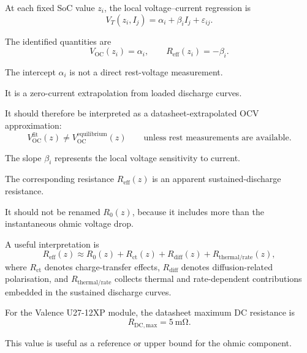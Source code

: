 \documentclass[a4paper,12pt]{article}
\begin{document}
At each fixed SoC value \(z_i\), the local voltage--current regression is
\begin{equation}
V_T(z_i,I_j)
=
\alpha_i
+
\beta_i I_j
+
\varepsilon_{ij}.
\label{eq:interp_local_regression}
\end{equation}

The identified quantities are
\begin{equation}
V_{\mathrm{OC}}(z_i)
=
\alpha_i,
\qquad
R_{\mathrm{eff}}(z_i)
=
-\beta_i.
\label{eq:interp_ocv_reff}
\end{equation}

The intercept \(\alpha_i\) is not a direct rest-voltage measurement.

It is a zero-current extrapolation from loaded discharge curves.

It should therefore be interpreted as a datasheet-extrapolated OCV approximation:
\begin{equation}
V_{\mathrm{OC}}^{\mathrm{fit}}(z)
\neq
V_{\mathrm{OC}}^{\mathrm{equilibrium}}(z)
\qquad
\text{unless rest measurements are available.}
\label{eq:interp_ocv_not_true_equilibrium}
\end{equation}

The slope \(\beta_i\) represents the local voltage sensitivity to current.

The corresponding resistance \(R_{\mathrm{eff}}(z)\) is an apparent sustained-discharge resistance.

It should not be renamed \(R_0(z)\), because it includes more than the instantaneous ohmic voltage drop.

A useful interpretation is
\begin{equation}
R_{\mathrm{eff}}(z)
\approx
R_0(z)
+
R_{\mathrm{ct}}(z)
+
R_{\mathrm{diff}}(z)
+
R_{\mathrm{thermal/rate}}(z),
\label{eq:interp_reff_components}
\end{equation}
where \(R_{\mathrm{ct}}\) denotes charge-transfer effects, \(R_{\mathrm{diff}}\) denotes diffusion-related polarisation, and \(R_{\mathrm{thermal/rate}}\) collects thermal and rate-dependent contributions embedded in the sustained discharge curves.

For the Valence U27-12XP module, the datasheet maximum DC resistance is
\begin{equation}
R_{\mathrm{DC,max}}
=
\SI{5}{\milli\ohm}.
\label{eq:interp_valence_rdc}
\end{equation}

This value is useful as a reference or upper bound for the ohmic component.
\end{document}
